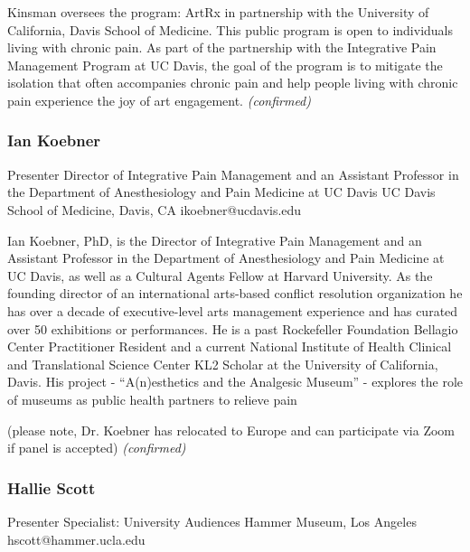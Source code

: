 \documentclass{report}
\begin{document}
                Kinsman oversees the program: ArtRx in partnership with the University of California, Davis School of Medicine. This public program is open to individuals living with chronic pain. As part of the partnership with the Integrative Pain Management Program at UC Davis, the goal of the program is to mitigate the isolation that often accompanies chronic pain and help people living with chronic pain experience the joy of art engagement.
                \emph{ (confirmed) }
              

              
                \subsubsection*{ Ian Koebner }
                Presenter\newline
                Director of Integrative Pain Management and an Assistant Professor in the Department of Anesthesiology and Pain Medicine at UC Davis\newline
                 UC Davis School of Medicine, Davis, CA
                \newline
                ikoebner@ucdavis.edu\newline
                
                

                Ian Koebner, PhD, is the Director of Integrative Pain Management and an Assistant Professor in the Department of Anesthesiology and Pain Medicine at UC Davis, as well as a Cultural Agents Fellow at Harvard University. As the founding director of an international arts-based conflict resolution organization he has over a decade of executive-level arts management experience and has curated over 50 exhibitions or performances. He is a past Rockefeller Foundation Bellagio Center Practitioner Resident and a current National Institute of Health Clinical and Translational Science Center KL2 Scholar at the University of California, Davis. His project - “A(n)esthetics and the Analgesic Museum” - explores the role of museums as public health partners to relieve pain 

(please note, Dr. Koebner has relocated to Europe and can participate via Zoom if panel is accepted)
                \emph{ (confirmed) }
              

              
                \subsubsection*{ Hallie  Scott }
                Presenter\newline
                Specialist: University Audiences\newline
                Hammer Museum, Los Angeles
                \newline
                hscott@hammer.ucla.edu\newline
                
\end{document}
